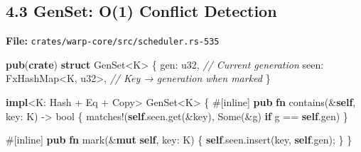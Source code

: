 \documentclass[11pt]{book}
\newenvironment{Shaded}{}{}
\newcommand{\AttributeTok}[1]{\textcolor[rgb]{0.49,0.56,0.16}{#1}}
\newcommand{\BuiltInTok}[1]{\textcolor[rgb]{0.00,0.50,0.00}{#1}}
\newcommand{\CommentTok}[1]{\textcolor[rgb]{0.38,0.63,0.69}{\textit{#1}}}
\newcommand{\ConstantTok}[1]{\textcolor[rgb]{0.53,0.00,0.00}{#1}}
\newcommand{\ControlFlowTok}[1]{\textcolor[rgb]{0.00,0.44,0.13}{\textbf{#1}}}
\newcommand{\DataTypeTok}[1]{\textcolor[rgb]{0.56,0.13,0.00}{#1}}
\newcommand{\KeywordTok}[1]{\textcolor[rgb]{0.00,0.44,0.13}{\textbf{#1}}}
\newcommand{\NormalTok}[1]{#1}
\newcommand{\OperatorTok}[1]{\textcolor[rgb]{0.40,0.40,0.40}{#1}}
\newcommand{\PreprocessorTok}[1]{\textcolor[rgb]{0.74,0.48,0.00}{#1}}
\begin{document}
\subsection{4.3 GenSet: O(1) Conflict
Detection}\label{genset-o1-conflict-detection}

\textbf{File:} \texttt{crates/warp-core/src/scheduler.rs-535}

\begin{Shaded}
\begin{Highlighting}[]
\KeywordTok{pub}\NormalTok{(}\KeywordTok{crate}\NormalTok{) }\KeywordTok{struct}\NormalTok{ GenSet}\OperatorTok{\textless{}}\NormalTok{K}\OperatorTok{\textgreater{}} \OperatorTok{\{}
\NormalTok{    gen}\OperatorTok{:} \DataTypeTok{u32}\OperatorTok{,}                    \CommentTok{// Current generation}
\NormalTok{    seen}\OperatorTok{:}\NormalTok{ FxHashMap}\OperatorTok{\textless{}}\NormalTok{K}\OperatorTok{,} \DataTypeTok{u32}\OperatorTok{\textgreater{},}     \CommentTok{// Key → generation when marked}
\OperatorTok{\}}

\KeywordTok{impl}\OperatorTok{\textless{}}\NormalTok{K}\OperatorTok{:} \BuiltInTok{Hash} \OperatorTok{+} \BuiltInTok{Eq} \OperatorTok{+} \BuiltInTok{Copy}\OperatorTok{\textgreater{}}\NormalTok{ GenSet}\OperatorTok{\textless{}}\NormalTok{K}\OperatorTok{\textgreater{}} \OperatorTok{\{}
    \AttributeTok{\#[}\NormalTok{inline}\AttributeTok{]}
    \KeywordTok{pub} \KeywordTok{fn}\NormalTok{ contains(}\OperatorTok{\&}\KeywordTok{self}\OperatorTok{,}\NormalTok{ key}\OperatorTok{:}\NormalTok{ K) }\OperatorTok{{-}\textgreater{}} \DataTypeTok{bool} \OperatorTok{\{}
        \PreprocessorTok{matches!}\NormalTok{(}\KeywordTok{self}\OperatorTok{.}\NormalTok{seen}\OperatorTok{.}\NormalTok{get(}\OperatorTok{\&}\NormalTok{key)}\OperatorTok{,} \ConstantTok{Some}\NormalTok{(}\OperatorTok{\&}\NormalTok{g) }\ControlFlowTok{if}\NormalTok{ g }\OperatorTok{==} \KeywordTok{self}\OperatorTok{.}\NormalTok{gen)}
    \OperatorTok{\}}

    \AttributeTok{\#[}\NormalTok{inline}\AttributeTok{]}
    \KeywordTok{pub} \KeywordTok{fn}\NormalTok{ mark(}\OperatorTok{\&}\KeywordTok{mut} \KeywordTok{self}\OperatorTok{,}\NormalTok{ key}\OperatorTok{:}\NormalTok{ K) }\OperatorTok{\{}
        \KeywordTok{self}\OperatorTok{.}\NormalTok{seen}\OperatorTok{.}\NormalTok{insert(key}\OperatorTok{,} \KeywordTok{self}\OperatorTok{.}\NormalTok{gen)}\OperatorTok{;}
    \OperatorTok{\}}
\OperatorTok{\}}
\end{Highlighting}
\end{Shaded}
\end{document}
